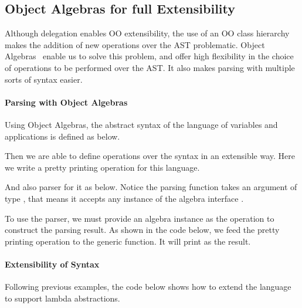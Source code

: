 \subsection{Object Algebras for full Extensibility}\label{subsec:overview-oa}

Although delegation enables OO extensibility, the use of an OO class
hierarchy makes the addition of new operations over the AST
problematic. Object Algebras~\cite{} enable us to solve this problem, and
offer high flexibility in the choice of operations to be performed
over the AST. It also makes parsing with multiple sorts of syntax easier.

\paragraph{Parsing with Object Algebras} Using Object Algebras, the abstract syntax of the language of variables and applications is defined as below.


Then we are able to define operations over the syntax in an extensible way. Here we write a pretty printing operation for this language.


And also parser for it as below. Notice the parsing function  takes an argument of type , that means it accepts any instance of the algebra interface .


To use the parser, we must provide an algebra instance as the operation to construct the parsing result. As shown in the code below, we feed the pretty printing operation  to the generic  function. It will print  as the result.


\paragraph{Extensibility of Syntax} Following previous examples, the code below shows how to extend the language to support lambda abstractions.

